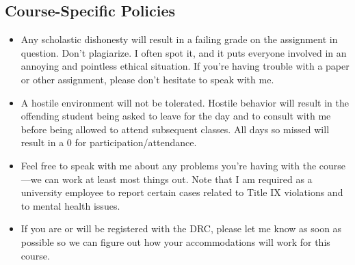 \documentclass[12pt]{article}
\begin{document}
\subsection{Course-Specific Policies}
\begin{itemize}
    \item Any scholastic dishonesty will result in a failing grade on the assignment in question.  Don’t plagiarize. I often spot it, and it puts everyone involved in an annoying and pointless ethical situation. If you’re having trouble with a paper or other assignment, please don't hesitate to speak with me.
    \item A hostile environment will not be tolerated. Hostile behavior will result in the offending student being asked to leave for the day and to consult with me before being allowed to attend subsequent classes. All days so missed will result in a 0 for participation/attendance.
    \item Feel free to speak with me about any problems you're having with the course---we can work at least most things out. Note that I am required as a university employee to report certain cases related to Title IX violations and to mental health issues.
    \item If you are or will be registered with the DRC, please let me know as soon as possible so we can figure out how your accommodations will work for this course.
\end{itemize}
\end{document}

